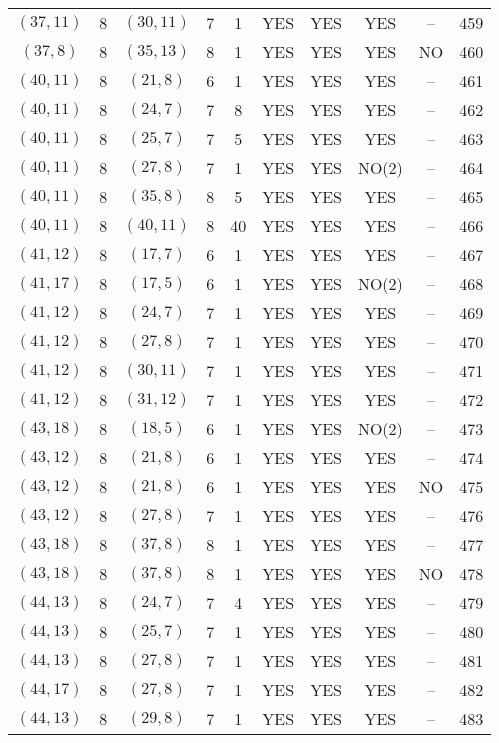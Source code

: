 \begin{longtable}{|c|c|c|c|c|c|c|c|c|c|}
$(37, 11)$ & 8 & $(30, 11)$ & 7 & 1 & YES & YES & YES & -- & 459\\
$(37, 8)$ & 8 & $(35, 13)$ & 8 & 1 & YES & YES & YES & NO & 460\\
$(40, 11)$ & 8 & $(21, 8)$ & 6 & 1 & YES & YES & YES & -- & 461\\
$(40, 11)$ & 8 & $(24, 7)$ & 7 & 8 & YES & YES & YES & -- & 462\\
$(40, 11)$ & 8 & $(25, 7)$ & 7 & 5 & YES & YES & YES & -- & 463\\
$(40, 11)$ & 8 & $(27, 8)$ & 7 & 1 & YES & YES & NO(2) & -- & 464\\
$(40, 11)$ & 8 & $(35, 8)$ & 8 & 5 & YES & YES & YES & -- & 465\\
$(40, 11)$ & 8 & $(40, 11)$ & 8 & 40 & YES & YES & YES & -- & 466\\
$(41, 12)$ & 8 & $(17, 7)$ & 6 & 1 & YES & YES & YES & -- & 467\\
$(41, 17)$ & 8 & $(17, 5)$ & 6 & 1 & YES & YES & NO(2) & -- & 468\\
$(41, 12)$ & 8 & $(24, 7)$ & 7 & 1 & YES & YES & YES & -- & 469\\
$(41, 12)$ & 8 & $(27, 8)$ & 7 & 1 & YES & YES & YES & -- & 470\\
$(41, 12)$ & 8 & $(30, 11)$ & 7 & 1 & YES & YES & YES & -- & 471\\
$(41, 12)$ & 8 & $(31, 12)$ & 7 & 1 & YES & YES & YES & -- & 472\\
$(43, 18)$ & 8 & $(18, 5)$ & 6 & 1 & YES & YES & NO(2) & -- & 473\\
$(43, 12)$ & 8 & $(21, 8)$ & 6 & 1 & YES & YES & YES & -- & 474\\
$(43, 12)$ & 8 & $(21, 8)$ & 6 & 1 & YES & YES & YES & NO & 475\\
$(43, 12)$ & 8 & $(27, 8)$ & 7 & 1 & YES & YES & YES & -- & 476\\
$(43, 18)$ & 8 & $(37, 8)$ & 8 & 1 & YES & YES & YES & -- & 477\\
$(43, 18)$ & 8 & $(37, 8)$ & 8 & 1 & YES & YES & YES & NO & 478\\
$(44, 13)$ & 8 & $(24, 7)$ & 7 & 4 & YES & YES & YES & -- & 479\\
$(44, 13)$ & 8 & $(25, 7)$ & 7 & 1 & YES & YES & YES & -- & 480\\
$(44, 13)$ & 8 & $(27, 8)$ & 7 & 1 & YES & YES & YES & -- & 481\\
$(44, 17)$ & 8 & $(27, 8)$ & 7 & 1 & YES & YES & YES & -- & 482\\
$(44, 13)$ & 8 & $(29, 8)$ & 7 & 1 & YES & YES & YES & -- & 483\\

\end{longtable}
